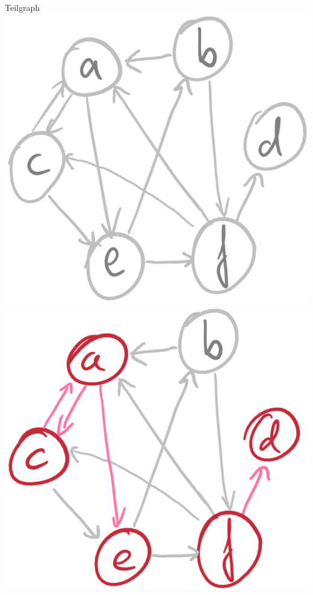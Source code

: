 \begin{frame}{Teilgraph}
	\includegraphics[scale=0.2]{images/graph_teilgraph_01.png}\ip
	\includegraphics[scale=0.2]{images/graph_teilgraph_02.png}\ip

\end{frame}
